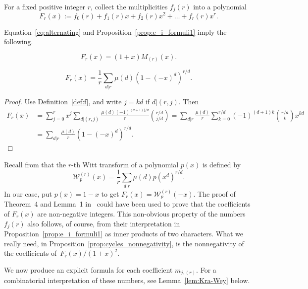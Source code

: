\begin{definition}\label{def:F_polynomial}
    For a fixed positive integer $r$, collect the multiplicities $f_j(r)$ into a polynomial
    \[
	    F_r(x) := f_0(r) + f_1(r)x + f_2(r)x^2+ \ldots + f_r(r)x^r.
    \]
\end{definition}

Equation~\eqref{eq:alternating} and Proposition~\ref{prop:e_i_formuli1} imply the following. 

\begin{corollary}\label{t:F_and_M}
    \[
        F_r(x) = (1+x) M_{(r)}(x).
    \]
\end{corollary}

\begin{observation}\label{t:F}
    \[
        F_r(x) = \frac{1}{r} \sum_{d|r} \mu(d) (1-(-x)^d)^{r/d}.
    \]
\end{observation}

\begin{proof}
    Use Definition~\ref{def:f}, and write $j = kd$ if $d | (r,j)$. Then
    \begin{align*}
        F_r(x) 
        &= \sum_{j=0}^{r} x^j \sum_{d|(r,j)} \frac{\mu(d) (-1)^{(d+1)j/d}}{r} \binom{r/d}{j/d} 
        = \sum_{d|r} \frac{\mu(d)}{r} \sum_{k=0}^{r/d} (-1)^{(d+1)k} \binom{r/d}{k}x^{k d} \\
        &= \sum_{d|r} \frac{\mu(d)}{r} (1-(-x)^d)^{r/d}.
    \end{align*}

\end{proof}
	
\begin{remark}
    Recall from \cite{Moree} that the $r$-th Witt transform of a polynomial $p(x)$ is defined by 
    \[
        \mathcal{W}_p^{(r)}(x)=\frac{1}{r}\sum_{d|r}\mu(d)p(x^d)^{r/d}.
    \] 
    In our case, put $p(x)=1-x$ to get $F_r(x) = \mathcal{W}_p^{(r)}(-x)$. 
    The proof of Theorem~4 and Lemma~1 in~\cite{Moree} could have been used to prove that the coefficients of $F_r(x)$ are non-negative integers. This non-obvious property of the numbers $f_j(r)$ also follows, of course, from their interpretation in Proposition~\ref{prop:e_i_formuli1} as inner products of two characters.
    What we really need, in Proposition~\ref{prop:cycles_nonnegativity}, is the nonnegativity of the coefficients of~$F_r(x)/(1+x)^2$.
\end{remark}

We now produce an explicit formula for each coefficient $m_{j,(r)}$. For a combinatorial interpretation of these numbers, see Lemma~\ref{lem:Kra-Wey} below.

